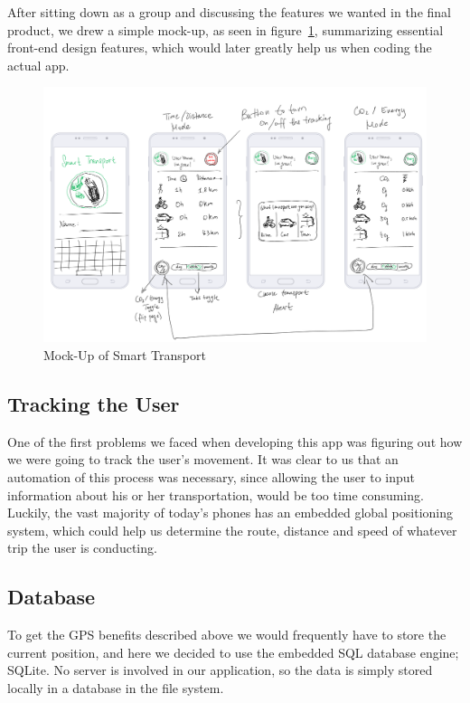 \documentclass[10pt,conference,compsocconf]{IEEEtran}
\begin{document}
After sitting down as a group and discussing the features we wanted in the final product, we drew a simple mock-up, as seen in figure~\ref{fig:mock-up}, summarizing essential front-end design features, which would later greatly help us when coding the actual app.

\begin{figure}[h]
	\centering
	\includegraphics[width=\columnwidth]{ressources/mock-up.png}
	\vspace{-1.5em} %
	\caption{Mock-Up of Smart Transport}
	\label{fig:mock-up}
\end{figure}


\subsection{Tracking the User}

One of the first problems we faced when developing this app was figuring out how we were going to track the user’s movement. It was clear to us that an automation of this process was necessary, since allowing the user to input information about his or her transportation, would be too time consuming. Luckily, the vast majority of today’s phones has an embedded global positioning system, which could help us determine the route, distance and speed of whatever trip the user is conducting.

\subsection{Database}

To get the GPS benefits described above we would frequently have to store the current position, and here we decided to use the embedded SQL database engine; SQLite. No server is involved in our application, so the data is simply stored locally in a database in the file system.
\end{document}
